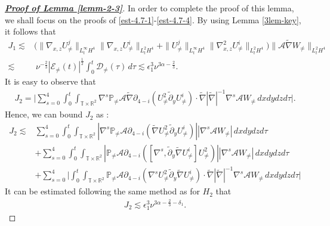\documentclass[11pt,reqno]{article}
\numberwithin{equation}{section}
\newcommand\R{{\mathbb R}}
\newcommand\T{{\mathbb T}}
\newcommand\PP{{\mathbb P}}
\newcommand\D{{\mathcal D}}
\newcommand\E{{\mathcal E}}
\newcommand\A{\mathcal{A}}
\let\pa=\partial
\let\al=\alpha
\let\f=\frac
\let\ep=\epsilon
\begin{document}
\begin{proof}[\underline{\textbf{Proof of Lemma \ref{lemm-2-3}}}]
In order to complete the proof of this lemma, we shall focus on the proofs of
\eqref{est-4.7-1}-\eqref{est-4.7-4}.
By using Lemma \ref{3lem-key}, it follows that
\begin{align*}
	J_1
	\lesssim& 
	\big(\|\nabla_{x,z}U^j_{\not=}\|_{L^\infty_tH^4}\|\nabla_{x,z}U^i_{\not=}\|_{L^2_tH^4}
	+
	\|U^j_{\not=}\|_{L^\infty_tH^4}\|\nabla_{x,z}^2U^i_{\not=}\|_{L^2_tH^4}\big)
	\|\A\widetilde{\nabla}W_{\not=}\|_{L^2_tH^4}
	\\
	\lesssim& ~\nu^{-\f23}|\E_{\not=}(t)|^{\f12}\int_0^t\D_{\not=}(\tau)\,d\tau
	\lesssim \ep_1^3\nu^{3\al-\f23}.
\end{align*}
It is easy to observe that
\begin{align*}
    J_2=\Big| \sum_{s=0}^{4}
	\int_0^t\int_{\T\times\R^2}
	\nabla^s\PP_{\not=}\A\widetilde{\nabla}\pa_{4-i}(U^2_{\not=}\tilde{\pa}_{y}U^i_{\not=})\cdot
	\widetilde{\nabla}|\widetilde{\nabla}|^{-1}\nabla^s\A W_{\not=} \,dxdydzd\tau \Big|.
\end{align*}
Hence, we can bound $J_2$ as :
\begin{align*}
	J_2\lesssim &\sum_{s=0}^{4}
	\int_0^t\int_{\T\times\R^2}
	|\nabla^s\PP_{\not=}\A\pa_{4-i}(\widetilde{\nabla}U^2_{\not=}\tilde{\pa}_{y}U^i_{\not=})|
	|\nabla^s\A W_{\not=}|\,dxdydzd\tau
	\\
	&+\sum_{s=0}^{4}
	\int_0^t\int_{\T\times\R^2}
	|\PP_{\not=}\A\pa_{4-i}([\nabla^s,\tilde{\pa}_{y}\widetilde{\nabla}U^i_{\not=}]U^2_{\not=})|
	|\nabla^s\A W_{\not=}|\,dxdydzd\tau\\&+\sum_{s=0}^{4}\Big|
	\int_0^t\int_{\T\times\R^2}
	\PP_{\not=}\A\pa_{4-i}(\nabla^sU^2_{\not=}\tilde{\pa}_{y}\widetilde{\nabla}U^i_{\not=})
    \cdot
	\widetilde{\nabla}|\widetilde{\nabla}|^{-1}\nabla^s\A W_{\not=}\,dxdydzd\tau\Big|
\end{align*}
It can be estimated following the same method as for $H_2$ that
\begin{align*}
	J_2 \lesssim \ep_1^3\nu^{3\al-\f23-\delta_1}.
\end{align*}

\end{proof}
\end{document}
